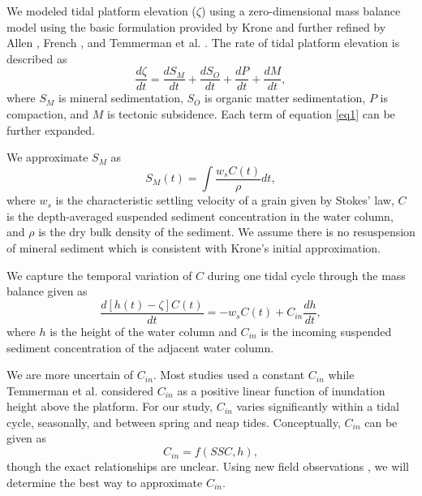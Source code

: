 \documentclass{wscpaperproc}
\theoremstyle{wsc}
\begin{document}
We modeled tidal platform elevation ($\zeta$) using a zero-dimensional mass balance model using the basic formulation provided by Krone \cite{kroneMethodSimulatingMarsh1987} and further refined by Allen \cite{allenSaltmarshGrowthStratification1990}, French \cite{frenchNumericalSimulationVertical1993}, and Temmerman et al. \cite{temmermanModellingLongtermTidal2003,temmermanModellingEstuarineVariations2004}. The rate of tidal platform elevation is described as
\begin{equation}\label{eq1}
	\frac{d \zeta}{d t} = \frac{d S_M}{d t} + \frac{d S_O}{d t} + \frac{d P}{d t} + \frac{d M}{d t},
\end{equation}
where $S_M$ is mineral sedimentation, $S_O$ is organic matter sedimentation, $P$ is compaction, and $M$ is tectonic subsidence. Each term of equation \ref{eq1} can be further expanded.

We approximate $S_M$ as
\begin{equation}\label{eq2}
	S_M(t) = \int{\frac{w_{s}C(t)}{\rho}dt},
\end{equation}
where $w_s$ is the characteristic settling velocity of a grain given by Stokes' law, $C$ is the depth-averaged suspended sediment concentration in the water column, and $\rho$ is the dry bulk density of the sediment. We assume there is no resuspension of mineral sediment which is consistent with Krone's \cite{kroneMethodSimulatingMarsh1987} initial approximation.

We capture the temporal variation of $C$ during one tidal cycle through the mass balance given as
\begin{equation}\label{eq3}
	\frac{d[h(t)-\zeta]C(t)}{dt} = -w_sC(t)+C_{in}\frac{dh}{dt},
\end{equation}
where $h$ is the height of the water column and $C_{in}$ is the incoming suspended sediment concentration of the adjacent water column.

We are more uncertain of $C_{in}$. Most studies \cite{kroneMethodSimulatingMarsh1987,allenSaltmarshGrowthStratification1990,frenchNumericalSimulationVertical1993,frenchTidalMarshSedimentation2006} used a constant $C_{in}$ while Temmerman et al. \cite{temmermanModellingLongtermTidal2003,temmermanModellingEstuarineVariations2004} considered $C_{in}$ as a positive linear function of inundation height above the platform. For our study, $C_{in}$ varies significantly within a tidal cycle, seasonally, and between spring and neap tides. Conceptually, $C_{in}$ can be given as
\begin{equation}\label{eq4}
	C_{in} = f(SSC, h),
\end{equation}
though the exact relationships are unclear. Using new field observations \cite{haleObservationsScalingTidal2019}, we will determine the best way to approximate $C_{in}$.
\end{document}
